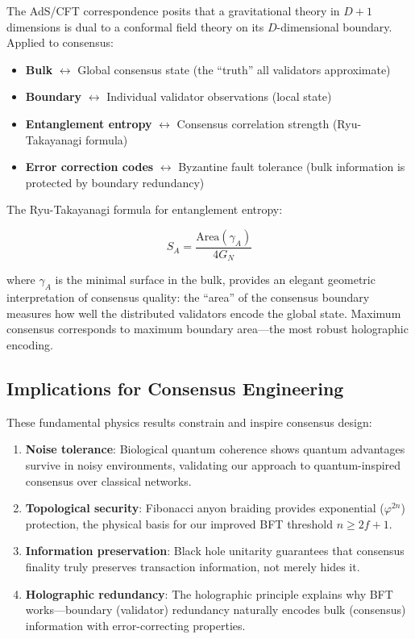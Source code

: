 \documentclass[11pt,a4paper]{article}
\begin{document}
The AdS/CFT correspondence \cite{maldacena1999} posits that a gravitational theory in $D+1$ dimensions is dual to a conformal field theory on its $D$-dimensional boundary. Applied to consensus:

\begin{itemize}
    \item \textbf{Bulk} $\leftrightarrow$ Global consensus state (the ``truth'' all validators approximate)
    \item \textbf{Boundary} $\leftrightarrow$ Individual validator observations (local state)
    \item \textbf{Entanglement entropy} $\leftrightarrow$ Consensus correlation strength (Ryu-Takayanagi formula)
    \item \textbf{Error correction codes} $\leftrightarrow$ Byzantine fault tolerance (bulk information is protected by boundary redundancy)
\end{itemize}

The Ryu-Takayanagi formula for entanglement entropy:

\begin{equation}
S_A = \frac{\text{Area}(\gamma_A)}{4G_N}
\end{equation}

where $\gamma_A$ is the minimal surface in the bulk, provides an elegant geometric interpretation of consensus quality: the ``area'' of the consensus boundary measures how well the distributed validators encode the global state. Maximum consensus corresponds to maximum boundary area---the most robust holographic encoding.

\subsection{Implications for Consensus Engineering}

These fundamental physics results constrain and inspire consensus design:

\begin{enumerate}
    \item \textbf{Noise tolerance}: Biological quantum coherence shows quantum advantages survive in noisy environments, validating our approach to quantum-inspired consensus over classical networks.
    \item \textbf{Topological security}: Fibonacci anyon braiding provides exponential ($\varphi^{2n}$) protection, the physical basis for our improved BFT threshold $n \geq 2f+1$.
    \item \textbf{Information preservation}: Black hole unitarity guarantees that consensus finality truly preserves transaction information, not merely hides it.
    \item \textbf{Holographic redundancy}: The holographic principle explains why BFT works---boundary (validator) redundancy naturally encodes bulk (consensus) information with error-correcting properties.
\end{enumerate}
\end{document}
